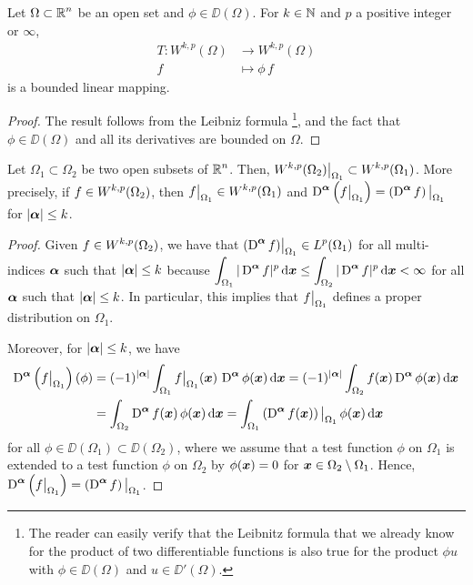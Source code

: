 \begin{prop} \label{sob_T_dd_wkp}
Let $\displaystyle \Omega \subset \mathbb{R}^n$ be an open set and
$\phi \in \DD(\Omega)$.
For $k\in \mathbb{N}$ and $p$ a positive integer or $\infty$,
\begin{align*}
T: W^{k,p}(\Omega) &\rightarrow W^{k,p}(\Omega) \\
f &\mapsto \phi \,f 
\end{align*}
is a bounded linear mapping.
\end{prop}

\begin{proof}
The result follows from the Leibniz formula \footnote{The reader can
easily verify that the Leibnitz formula that we already know for the
product of two differentiable functions
is also true for the product $\phi u$ with $\phi \in \DD(\Omega)$ and
$u \in \DD'(\Omega)$.}, and the fact that $\phi\in \DD(\Omega)$ and
all its derivatives are bounded on $\Omega$.
\end{proof}

\begin{lemma} \label{sobVsubsetU}
Let $\Omega_1 \subset \Omega_2$ be two open subsets of
$\displaystyle \mathbb{R}^n$.  Then,
$\displaystyle W^{k,p}(\Omega_2)\big|_{\Omega_1} \subset W^{k,p}(\Omega_1)$.  More
precisely, if $\displaystyle f \in W^{k,p}(\Omega_2)$, then
$\displaystyle f\big|_{\Omega_1} \in W^{k,p}(\Omega_1)$ and
$\displaystyle \operatorname{D}^{{\bm{\alpha}}} \left(f\big|_{\Omega_1}\right) =
\left( \operatorname{D}^{{\bm{\alpha}}} f \right)\big|_{\Omega_1}$ for
$|{\bm{\alpha}}| \leq k$.
\end{lemma}

\begin{proof}
Given $\displaystyle f \in W^{k,p}(\Omega_2)$, we have that
$\displaystyle (\operatorname{D}^{{\bm{\alpha}}} f)\big|_{\Omega_1} \in L^p(\Omega_1)$ for
all multi-indices ${\bm{\alpha}}$ such that $|{\bm{\alpha}}|\leq k$ because
$\displaystyle \int_{\Omega_1} |\operatorname{D}^{{\bm{\alpha}}} f|^p \,\mathrm{d}{{\bm{x}}} \leq 
\int_{\Omega_2} |\operatorname{D}^{{\bm{\alpha}}} f|^p \,\mathrm{d}{{\bm{x}}} < \infty$
for all ${\bm{\alpha}}$ such that $|{\bm{\alpha}}|\leq k$.  In
particular, this implies that 
$\displaystyle f\big|_{\Omega_1}$ defines a proper distribution on $\Omega_1$.

Moreover, for $|{\bm{\alpha}}| \leq k$, we have
\begin{align*}
\operatorname{D}^{{\bm{\alpha}}} \left(f\big|_{\Omega_1}\right)(\phi)
&= (-1)^{|{\bm{\alpha}}|} \int_{\Omega_1} f\big|_{\Omega_1}({\bm{x}})
\,\operatorname{D}^{{\bm{\alpha}}}\phi({\bm{x}}) \,\mathrm{d}{{\bm{x}}}
= (-1)^{|{\bm{\alpha}}|} \int_{\Omega_2} f({\bm{x}})
\operatorname{D}^{{\bm{\alpha}}}\phi({\bm{x}}) \,\mathrm{d}{{\bm{x}}} \\
&= \int_{\Omega_2} \operatorname{D}^{{\bm{\alpha}}} f({\bm{x}}) \, \phi({\bm{x}}) \,\mathrm{d}{{\bm{x}}}
= \int_{\Omega_1} \left(\operatorname{D}^{{\bm{\alpha}}} f({\bm{x}})\right)\big|_{\Omega_1} \,
\phi({\bm{x}}) \,\mathrm{d}{{\bm{x}}}
\end{align*}
for all $\phi \in \DD(\Omega_1) \subset \DD(\Omega_2)$, where we
assume that a test function $\phi$ on $\Omega_1$ is extended to a test
function $\phi$ on $\Omega_2$ by
$\phi({\bm{x}}) = 0$ for ${\bm{x}} \in \Omega_2 \setminus \Omega_1$.  Hence,
$\displaystyle \operatorname{D}^{{\bm{\alpha}}} \left(f\big|_{\Omega_1}\right) =
\left( \operatorname{D}^{{\bm{\alpha}}} f \right)\big|_{\Omega_1}$.
\end{proof}


